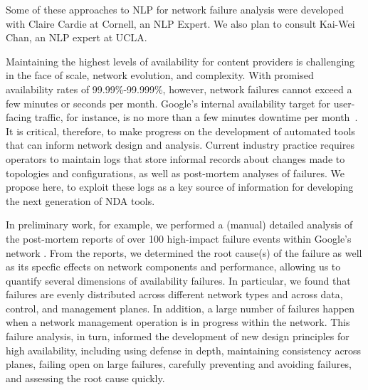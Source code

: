 Some of these approaches to NLP for network failure analysis were developed with Claire
Cardie at Cornell, an NLP Expert.  We also plan to consult Kai-Wei Chan, an NLP expert at UCLA.


\iffalse

Maintaining the highest levels of availability for content providers
is challenging in the face of scale, network evolution, and
complexity. With promised availability rates of 99.99\%-99.999\%,
however, network failures cannot exceed a few minutes or seconds per
month.  Google’s internal availability target for user-facing traffic,
for instance, is no more than a few minutes downtime per
month~\cite{rameshgoogle}.
%
It is critical, therefore, to make progress on the
development of automated tools that can inform network design and
analysis.
%
Current industry practice requires operators to maintain logs that
store informal records about changes made to topologies and
configurations, as well as post-mortem analyses of failures.  We
propose here, to exploit these logs as a key source of information for
developing the next generation of NDA tools.

In preliminary work, for example, we performed a (manual) detailed analysis
of the post-mortem reports of over 100 high-impact failure events
within Google’s network \cite{rameshgoogle}. From the
reports, we determined the root cause(s) of the failure
as well as its specfic effects on network components and performance,
allowing us to quantify several dimensions of availability
failures. In particular, we found that failures are evenly distributed
across different network types and across data, control, and
management planes.  In addition, a large number of failures happen when a
network management operation is in progress within the network.  This
failure analysis, in turn, informed the development of new design
principles for high availability, including using defense in depth,
maintaining consistency across planes, failing open on large failures,
carefully preventing and avoiding failures, and assessing the root
cause quickly.

